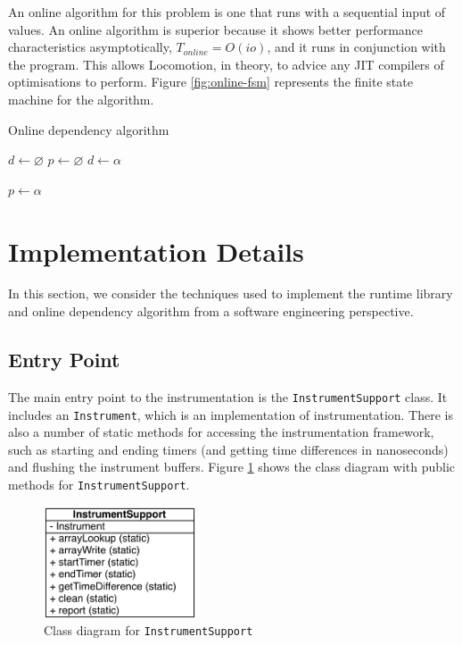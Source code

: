 	An online algorithm for this problem is one that runs with a sequential input of values. An online algorithm is superior because it shows better performance characteristics asymptotically, $T_{online} = O(io)$, and it runs in conjunction with the program. This allows Locomotion, in theory, to advice any JIT compilers of optimisations to perform. Figure \ref{fig:online-fsm} represents the finite state machine for the algorithm.
	
	\begin{algorithm}
		\caption{Online dependency algorithm}
		\label{alg:online-dependency}
		\begin{algorithmic}
			\STATE $d \gets \varnothing$ %
							\STATE $p \gets \varnothing$ %
											\STATE $d \gets \alpha$
										\ENDIF
										
										\STATE $p \gets \alpha$
									\ENDFOR
								\ENDFOR
							\ENDFOR
						\ENDFOR
		\end{algorithmic}
	\end{algorithm}

\section{Implementation Details} \label{sec:runtime/implementation}
In this section, we consider the techniques used to implement the runtime library and online dependency algorithm from a software engineering perspective.

	\subsection{Entry Point} \label{sec:runtime/implementation/entry-point}
	The main entry point to the instrumentation is the \texttt{InstrumentSupport} class. It includes an \texttt{Instrument}, which is an implementation of instrumentation. There is also a number of static methods for accessing the instrumentation framework, such as starting and ending timers (and getting time differences in nanoseconds) and flushing the instrument buffers. Figure \ref{fig:instrument-support} shows the class diagram with public methods for \texttt{InstrumentSupport}.
	
	\begin{figure}
		\centering
		\includegraphics[width=0.4\textwidth]{graphics/instrument-support.pdf}
		\caption{Class diagram for \texttt{InstrumentSupport}}
		\label{fig:instrument-support}
	\end{figure}
	
